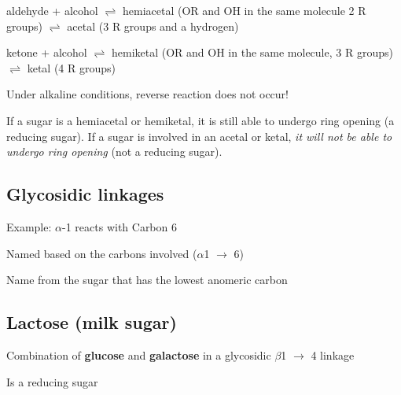 \documentclass[letterpaper, 12pt]{article}
\begin{document}
aldehyde + alcohol $\rightleftharpoons$ hemiacetal (OR and OH in the same molecule 2 R groups) $\rightleftharpoons$ acetal (3 R groups and a hydrogen)

ketone + alcohol $\rightleftharpoons$ hemiketal (OR and OH in the same molecule, 3 R groups) $\rightleftharpoons$ ketal (4 R groups)

Under alkaline conditions, reverse reaction does not occur!

If a sugar is a hemiacetal or hemiketal, it is still able to undergo ring opening (a reducing sugar). If a sugar is involved in an acetal or ketal, \textit{it will not be able to undergo ring opening} (not a reducing sugar).

\subsection*{Glycosidic linkages}
Example: $\alpha$-1 reacts with Carbon 6

Named based on the carbons involved ($\alpha$1 $\to$ 6)

Name from the sugar that has the lowest anomeric carbon

\subsection*{Lactose (milk sugar)}
Combination of \textbf{glucose} and \textbf{galactose} in a glycosidic $\beta$1 $\to$ 4 linkage

Is a reducing sugar
\end{document}
